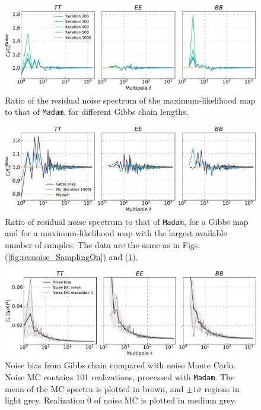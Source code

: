 \documentclass[twocolumn]{aa}
\newcommand{\Madam}{\texttt{Madam}}
\begin{document}
\begin{figure}
  \center
  \includegraphics[width=18cm]{figs/Fig_residual_noise_spectrum_ratio_SamplingOff.pdf}
  \caption{Ratio of the residual noise spectrum of the maximum-likelihood map to that of \Madam, for different Gibbs chain lengths.}
  \label{fig:resnoise_SamplingOff}
\end{figure}

\begin{figure}
  \center
  \includegraphics[width=18cm]{figs/Fig_residual_noise_spectrum_ratio_v2.pdf}
  \caption{Ratio of residual noise spectrum to that of \Madam, for a Gibbs map and for a maximum-likelihood map
  with the largest available number of samples.
  The data are the same as in Figs. (\ref{fig:resnoise_SamplingOn}) and (\ref{fig:resnoise_SamplingOff}).
  }\label{fig:resnoise_spectra}
\end{figure}


\begin{figure}
  \center
  \includegraphics[width=18cm]{figs/Fig_NoiseBias_SampleMapT_SampleNoiseT_FillGapsT_FileMaskT.pdf}
  \caption{Noise bias from Gibbs chain compared with noise Monte Carlo. Noise MC contains 101 realizations, processed with \Madam. 
  The mean of the MC spectra is plotted in brown, and $\pm1\sigma$ regions in light grey. 
  Realization 0 of noise MC is plotted in medium grey.}\label{fig:gibbs_noisebias}
\end{figure}
\end{document}
